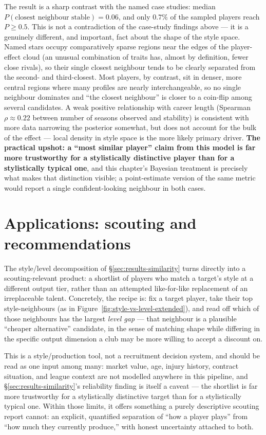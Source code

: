 The result is a sharp contrast with the named case studies: median $P(\text{closest neighbour stable}) = 0.06$,
and only $0.7\%$ of the sampled players reach $P \geq 0.5$. This is not a contradiction of the case-study
findings above --- it is a genuinely different, and important, fact about the shape of the style space. Named
stars occupy comparatively sparse regions near the edges of the player-effect cloud (an unusual combination of
traits has, almost by definition, fewer close rivals), so their single closest neighbour tends to be clearly
separated from the second- and third-closest. Most players, by contrast, sit in denser, more central regions
where many profiles are nearly interchangeable, so no single neighbour dominates and ``the closest neighbour''
is closer to a coin-flip among several candidates. A weak positive relationship with career length (Spearman
$\rho \approx 0.22$ between number of seasons observed and stability) is consistent with more data narrowing the
posterior somewhat, but does not account for the bulk of the effect --- local density in style space is the more
likely primary driver. \textbf{The practical upshot: a ``most similar player'' claim from this model is far
more trustworthy for a stylistically distinctive player than for a stylistically typical one}, and this chapter's
Bayesian treatment is precisely what makes that distinction visible; a point-estimate version of the same metric
would report a single confident-looking neighbour in both cases.

\section{Applications: scouting and recommendations}
\label{sec:results-scouting}

The style/level decomposition of \S\ref{sec:results-similarity} turns directly into a scouting-relevant product:
a shortlist of players who match a target's style at a different output tier, rather than an attempted
like-for-like replacement of an irreplaceable talent. Concretely, the recipe is: fix a target player, take their
top style-neighbours (as in Figure~\ref{fig:style-vs-level-extended}), and read off which of those neighbours
has the largest \emph{level gap} --- that neighbour is a plausible ``cheaper alternative'' candidate, in the
sense of matching shape while differing in the specific output dimension a club may be more willing to accept a
discount on.

This is a style/production tool, not a recruitment decision system, and should be read as one input among many:
market value, age, injury history, contract situation, and league context are not modelled anywhere in this
pipeline, and \S\ref{sec:results-similarity}'s reliability finding is itself a caveat --- the shortlist is far
more trustworthy for a stylistically distinctive target than for a stylistically typical one. Within those
limits, it offers something a purely descriptive scouting report cannot: an explicit, quantified separation of
``how a player plays'' from ``how much they currently produce,'' with honest uncertainty attached to both.

